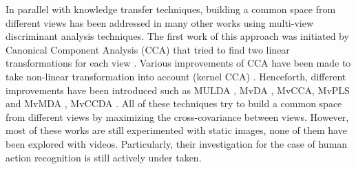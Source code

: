 
        In parallel with knowledge transfer techniques, building a common space from different views has been addressed in many other works using multi-view discriminant analysis techniques.
        The first work of this approach was initiated by Canonical Component Analysis (CCA) that tried to find two linear transformations for each view \cite{thompson1984canonical}.
        Various improvements of CCA have been made to take non-linear transformation into account (kernel CCA) \cite{hardoon2004canonical}.
        Henceforth, different improvements have been introduced such as MULDA \cite{yang2014multi}, MvDA \cite{kan2015multi}, MvCCA, MvPLS and MvMDA \cite{cao2017generalized}, MvCCDA \cite{you2019multi}.
        All of these techniques try to build a common space from different views by maximizing the cross-covariance between views. %
        However, most of these works are still experimented with static images, none of them have been explored with videos.
        Particularly, their investigation for the case of human action recognition is still actively under taken.

